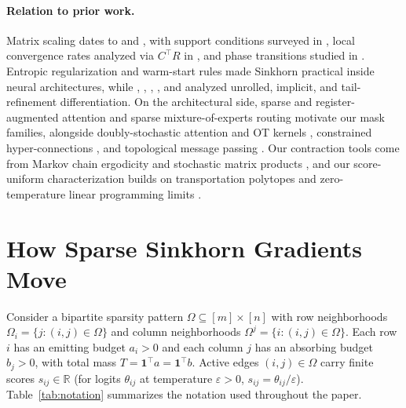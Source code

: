\documentclass[10pt]{article}
\newcommand{\one}{\mathbf{1}}
\begin{document}
\paragraph{Relation to prior work.}
Matrix scaling dates to \citet{sinkhornknopp1967} and \citet{franklin1989scaling}, with support conditions surveyed in \citet{idel2016review}, local convergence rates analyzed via $C^\top R$ in \citet{knight2008sinkhorn}, and phase transitions studied in \citet{he2026phase}. Entropic regularization \citep{cuturi2013sinkhorn,peyre2019computational} and warm-start rules \citep{thornton2023initialization} made Sinkhorn practical inside neural architectures, while \citet{luise2018differential}, \citet{eisenberger2022unified}, \citet{pauwels2023derivatives}, \citet{greco2023sinkhorn}, and \citet{forde2026blockwise} analyzed unrolled, implicit, and tail-refinement differentiation. On the architectural side, sparse and register-augmented attention \citep{child2019sparse,beltagy2020longformer,zaheer2020bigbird,roy2020routing,darcet2023registers} and sparse mixture-of-experts routing \citep{shazeer2017outrageously,fedus2022switch} motivate our mask families, alongside doubly-stochastic attention and OT kernels \citep{tay2020sparse,sander2022sinkformers,shahbazi2025lotformer,flashsinkhorn2026}, constrained hyper-connections \citep{mhc2025}, and topological message passing \citep{bodnar2022neural_sheaf,hajij2022topological}. Our contraction tools come from Markov chain ergodicity and stochastic matrix products \citep{doeblin1938expose,dobrushin1956central,wolfowitz1963products,seneta2006nonnegative,gaubert2013dobrushin,levin2017markov}, and our score-uniform characterization builds on transportation polytopes \citep{kleewitzgall1968faces,brualdi2006combinatorial,deloera2013transportation} and zero-temperature linear programming limits \citep{cominetti1994asymptotic,weed2018explicit}.

\section{How Sparse Sinkhorn Gradients Move}
\label{sec:calculus}

Consider a bipartite sparsity pattern $\Omega \subseteq [m]\times[n]$ with row neighborhoods $\Omega_i = \{j : (i,j)\in\Omega\}$ and column neighborhoods $\Omega^j = \{i : (i,j)\in\Omega\}$. Each row $i$ has an emitting budget $a_i > 0$ and each column $j$ has an absorbing budget $b_j > 0$, with total mass $T = \one^\top a = \one^\top b$. Active edges $(i,j) \in \Omega$ carry finite scores $s_{ij} \in \mathbb{R}$ (for logits $\theta_{ij}$ at temperature $\varepsilon > 0$, $s_{ij} = \theta_{ij}/\varepsilon$). Table~\ref{tab:notation} summarizes the notation used throughout the paper.
\end{document}
